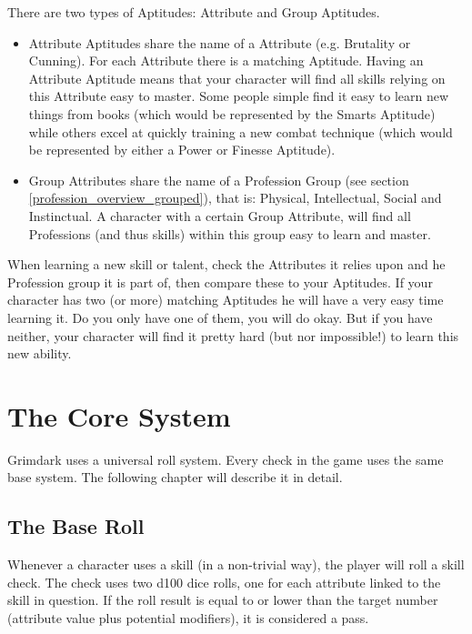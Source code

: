 	There are two types of Aptitudes: Attribute and Group Aptitudes.
	\begin{itemize}
		\item Attribute Aptitudes share the name of a Attribute (e.g. Brutality or Cunning). For each Attribute there is a matching Aptitude. Having an Attribute Aptitude means that your character will find all skills relying on this Attribute easy to master. Some people simple find it easy to learn new things from books (which would be represented by the Smarts Aptitude) while others excel at quickly training a new combat technique (which would be represented by either a Power or Finesse Aptitude).
		\item Group Attributes share the name of a Profession Group (see section \ref{profession_overview_grouped}), that is: Physical, Intellectual, Social and Instinctual. A character with a certain Group Attribute, will find all Professions (and thus skills) within this group easy to learn and master.
	\end{itemize}

	When learning a new skill or talent, check the Attributes it relies upon and he Profession group it is part of, then compare these to your Aptitudes.
	If your character has two (or more) matching Aptitudes he will have a very easy time learning it.
	Do you only have one of them, you will do okay.
	But if you have neither, your character will find it pretty hard (but nor impossible!) to learn this new ability.


\section{The Core System} %
\label{sec:base_system}
Grimdark uses a universal roll system. Every check in the game uses the same base system. The following chapter will describe it in detail.
\subsection{The Base Roll}
Whenever a character uses a skill (in a non-trivial way), the player will roll a skill check.
The check uses two d100 dice rolls, one for each attribute linked to the skill in question.
If the roll result is equal to or lower than the target number (attribute value plus potential modifiers), it is considered a pass.

